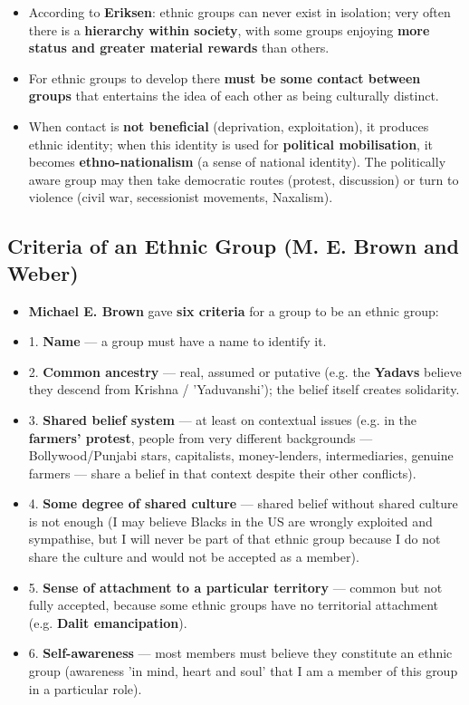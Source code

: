 \begin{KeyConcept}
\begin{itemize}
\item According to \textbf{Eriksen}: ethnic groups can never exist in isolation; very often there is a \textbf{hierarchy within society}, with some groups enjoying \textbf{more status and greater material rewards} than others.
\item For ethnic groups to develop there \textbf{must be some contact between groups} that entertains the idea of each other as being culturally distinct.
\item When contact is \textbf{not beneficial} (deprivation, exploitation), it produces ethnic identity; when this identity is used for \textbf{political mobilisation}, it becomes \textbf{ethno-nationalism} (a sense of national identity). The politically aware group may then take democratic routes (protest, discussion) or turn to violence (civil war, secessionist movements, Naxalism).
\end{itemize}
\end{KeyConcept}

\subsection{Criteria of an Ethnic Group (M. E. Brown and Weber)}

\begin{KeyConcept}
\begin{itemize}
\item \textbf{Michael E. Brown} gave \textbf{six criteria} for a group to be an ethnic group:
\item 1. \textbf{Name} --- a group must have a name to identify it.
\item 2. \textbf{Common ancestry} --- real, assumed or putative (e.g. the \textbf{Yadavs} believe they descend from Krishna / 'Yaduvanshi'); the belief itself creates solidarity.
\item 3. \textbf{Shared belief system} --- at least on contextual issues (e.g. in the \textbf{farmers' protest}, people from very different backgrounds --- Bollywood/Punjabi stars, capitalists, money-lenders, intermediaries, genuine farmers --- share a belief in that context despite their other conflicts).
\item 4. \textbf{Some degree of shared culture} --- shared belief without shared culture is not enough (I may believe Blacks in the US are wrongly exploited and sympathise, but I will never be part of that ethnic group because I do not share the culture and would not be accepted as a member).
\item 5. \textbf{Sense of attachment to a particular territory} --- common but not fully accepted, because some ethnic groups have no territorial attachment (e.g. \textbf{Dalit emancipation}).
\item 6. \textbf{Self-awareness} --- most members must believe they constitute an ethnic group (awareness 'in mind, heart and soul' that I am a member of this group in a particular role).
\end{itemize}
\end{KeyConcept}

